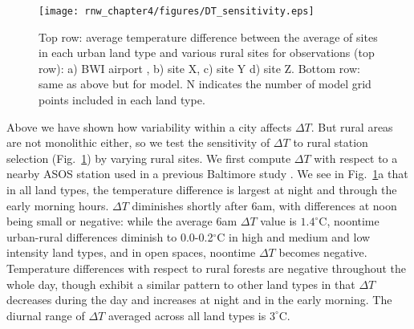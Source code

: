 \begin{figure}[h]
\centering
\texttt{[image: rnw\_chapter4/figures/DT\_sensitivity.eps]}
\caption{Top row: average temperature difference between the average of sites in each urban land type and various rural sites for observations (top row): a) BWI airport , b) site X, c) site Y  d) site Z. Bottom row: same as above but for model. N indicates the number of model grid points included in each land type.
}
\label{fig:dt_sensitivity}
\end{figure}

Above we have shown how variability within a city affects $\Delta T$. But rural areas are not monolithic either, so we test the sensitivity of $\Delta T$ to rural station selection  (Fig.~\ref{fig:dt_sensitivity}) by varying rural sites.
 We first compute $\Delta T$ with  respect to a nearby ASOS station used in a previous Baltimore study \citep{li2013synergistic}. We see in Fig.~\ref{fig:dt_sensitivity}a that
in all land types, the temperature difference is largest at night and through the early morning hours.
$\Delta T$ diminishes shortly after 6am, with differences at noon being small or negative: while the average 6am $\Delta T$ value  is $1.4^\circ $C, noontime urban-rural differences diminish to 0.0-0.2$^\circ$C in high and medium and low intensity land types, and in open spaces, noontime $\Delta T$ becomes negative.
Temperature differences with respect to rural forests are negative throughout the whole day, though exhibit a similar pattern to other land types in that $\Delta T$ decreases during the day and increases at night and in the early morning. The diurnal range of $\Delta T$ averaged across all land types is $3^\circ$C. 


